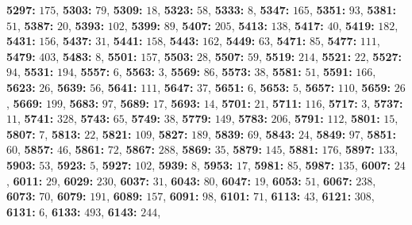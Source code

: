 \textsf{\bfseries 5297:} $175$, \textsf{\bfseries 5303:} $79$, \textsf{\bfseries 5309:} $18$, \textsf{\bfseries 5323:} $58$, \textsf{\bfseries 5333:} $8$, \textsf{\bfseries 5347:} $165$, \textsf{\bfseries 5351:} $93$, \textsf{\bfseries 5381:} $51$, \textsf{\bfseries 5387:} $20$, \textsf{\bfseries 5393:} $102$, \textsf{\bfseries 5399:} $89$, \textsf{\bfseries 5407:} $205$, \textsf{\bfseries 5413:} $138$, \textsf{\bfseries 5417:} $40$, \textsf{\bfseries 5419:} $182$, \textsf{\bfseries 5431:} $156$, \textsf{\bfseries 5437:} $31$, \textsf{\bfseries 5441:} $158$, \textsf{\bfseries 5443:} $162$, \textsf{\bfseries 5449:} $63$, \textsf{\bfseries 5471:} $85$, \textsf{\bfseries 5477:} $111$, \textsf{\bfseries 5479:} $403$, \textsf{\bfseries 5483:} $8$, \textsf{\bfseries 5501:} $157$, \textsf{\bfseries 5503:} $28$, \textsf{\bfseries 5507:} $59$, \textsf{\bfseries 5519:} $214$, \textsf{\bfseries 5521:} $22$, \textsf{\bfseries 5527:} $94$, \textsf{\bfseries 5531:} $194$, \textsf{\bfseries 5557:} $6$, \textsf{\bfseries 5563:} $3$, \textsf{\bfseries 5569:} $86$, \textsf{\bfseries 5573:} $38$, \textsf{\bfseries 5581:} $51$, \textsf{\bfseries 5591:} $166$, \textsf{\bfseries 5623:} $26$, \textsf{\bfseries 5639:} $56$, \textsf{\bfseries 5641:} $111$, \textsf{\bfseries 5647:} $37$, \textsf{\bfseries 5651:} $6$, \textsf{\bfseries 5653:} $5$, \textsf{\bfseries 5657:} $110$, \textsf{\bfseries 5659:} $26$, \textsf{\bfseries 5669:} $199$, \textsf{\bfseries 5683:} $97$, \textsf{\bfseries 5689:} $17$, \textsf{\bfseries 5693:} $14$, \textsf{\bfseries 5701:} $21$, \textsf{\bfseries 5711:} $116$, \textsf{\bfseries 5717:} $3$, \textsf{\bfseries 5737:} $11$, \textsf{\bfseries 5741:} $328$, \textsf{\bfseries 5743:} $65$, \textsf{\bfseries 5749:} $38$, \textsf{\bfseries 5779:} $149$, \textsf{\bfseries 5783:} $206$, \textsf{\bfseries 5791:} $112$, \textsf{\bfseries 5801:} $15$, \textsf{\bfseries 5807:} $7$, \textsf{\bfseries 5813:} $22$, \textsf{\bfseries 5821:} $109$, \textsf{\bfseries 5827:} $189$, \textsf{\bfseries 5839:} $69$, \textsf{\bfseries 5843:} $24$, \textsf{\bfseries 5849:} $97$, \textsf{\bfseries 5851:} $60$, \textsf{\bfseries 5857:} $46$, \textsf{\bfseries 5861:} $72$, \textsf{\bfseries 5867:} $288$, \textsf{\bfseries 5869:} $35$, \textsf{\bfseries 5879:} $145$, \textsf{\bfseries 5881:} $176$, \textsf{\bfseries 5897:} $133$, \textsf{\bfseries 5903:} $53$, \textsf{\bfseries 5923:} $5$, \textsf{\bfseries 5927:} $102$, \textsf{\bfseries 5939:} $8$, \textsf{\bfseries 5953:} $17$, \textsf{\bfseries 5981:} $85$, \textsf{\bfseries 5987:} $135$, \textsf{\bfseries 6007:} $24$, \textsf{\bfseries 6011:} $29$, \textsf{\bfseries 6029:} $230$, \textsf{\bfseries 6037:} $31$, \textsf{\bfseries 6043:} $80$, \textsf{\bfseries 6047:} $19$, \textsf{\bfseries 6053:} $51$, \textsf{\bfseries 6067:} $238$, \textsf{\bfseries 6073:} $70$, \textsf{\bfseries 6079:} $191$, \textsf{\bfseries 6089:} $157$, \textsf{\bfseries 6091:} $98$, \textsf{\bfseries 6101:} $71$, \textsf{\bfseries 6113:} $43$, \textsf{\bfseries 6121:} $308$, \textsf{\bfseries 6131:} $6$, \textsf{\bfseries 6133:} $493$, \textsf{\bfseries 6143:} $244$, 
